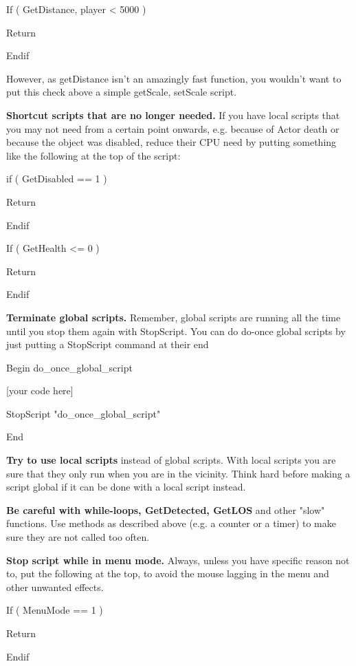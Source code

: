 \documentclass[
]{article}
\begin{document}
If ( GetDistance, player \textless{} 5000 )

Return

Endif

However, as getDistance isn't an amazingly fast function, you wouldn't
want to put this check above a simple getScale, setScale script.

\textbf{Shortcut scripts that are no longer needed.} If you have local
scripts that you may not need from a certain point onwards, e.g. because
of Actor death or because the object was disabled, reduce their CPU need
by putting something like the following at the top of the script:

if ( GetDisabled == 1 )

Return

Endif

If ( GetHealth \textless= 0 )

Return

Endif

\textbf{Terminate global scripts.} Remember, global scripts are running
all the time until you stop them again with StopScript. You can do
do-once global scripts by just putting a StopScript command at their end

Begin do\_once\_global\_script

{[}your code here{]}

StopScript "do\_once\_global\_script"

End

\textbf{Try to use local scripts} instead of global scripts. With local
scripts you are sure that they only run when you are in the vicinity.
Think hard before making a script global if it can be done with a local
script instead.

\textbf{Be careful with while-loops, GetDetected, GetLOS} and other
"slow" functions. Use methods as described above (e.g. a counter or a
timer) to make sure they are not called too often.

\textbf{Stop script while in menu mode.} Always, unless you have
specific reason not to, put the following at the top, to avoid the mouse
lagging in the menu and other unwanted effects.

If ( MenuMode == 1 )

Return

Endif

\hypertarget{section-12}{%
\subsection{}\label{section-12}}
\end{document}
